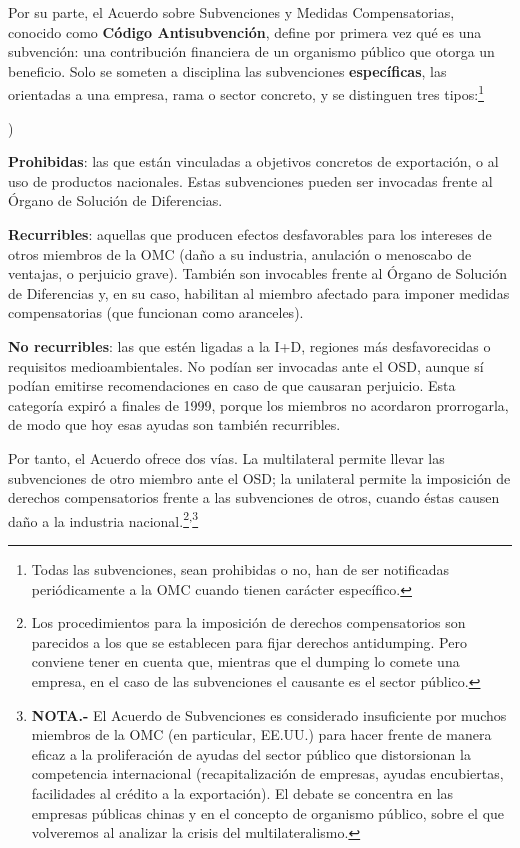 \documentclass[10pt,a4paper]{article}
\newcounter{alphaitem}
\newenvironment{la}
      {\begin{list}{\alph{alphaitem})}{%
          \usecounter{alphaitem}%
          \setlength{\leftmargin}{1cm}%
          \setlength{\parskip}{3pt}%
          \setlength{\itemsep}{0pt}%
          \setlength{\parsep}{0pt}%
      }}
      {\end{list}}
\begin{document}
Por su parte, el Acuerdo sobre Subvenciones y Medidas Compensatorias, conocido como \textbf{Código Antisubvención}, define por primera vez qué es una subvención: una contribución financiera de un organismo público que otorga un beneficio. Solo se someten a disciplina las subvenciones \textbf{específicas}, las orientadas a una empresa, rama o sector concreto, y se distinguen tres tipos:\footnote{%
  Todas las subvenciones, sean prohibidas o no, han de ser notificadas periódicamente a la OMC cuando tienen carácter específico. 
}
\begin{la}
    \item \textbf{Prohibidas}: las que están vinculadas a objetivos concretos de exportación, o al uso de productos nacionales. Estas subvenciones pueden ser invocadas frente al Órgano de Solución de Diferencias.
    \item \textbf{Recurribles}: aquellas que producen efectos desfavorables para los intereses de otros miembros de la OMC (daño a su industria, anulación o menoscabo de ventajas, o perjuicio grave). También son invocables frente al Órgano de Solución de Diferencias y, en su caso, habilitan al miembro afectado para imponer medidas compensatorias (que funcionan como aranceles).
    \item \textbf{No recurribles}: las que estén ligadas a la I+D, regiones más desfavorecidas o requisitos medioambientales. No podían ser invocadas ante el OSD, aunque sí podían emitirse recomendaciones en caso de que causaran perjuicio. Esta categoría expiró a finales de 1999, porque los miembros no acordaron prorrogarla, de modo que hoy esas ayudas son también recurribles.
\end{la}

Por tanto, el Acuerdo ofrece dos vías. La multilateral permite llevar las subvenciones de otro miembro ante el OSD; la unilateral permite la imposición de derechos compensatorios frente a las subvenciones de otros, cuando éstas causen daño a la industria nacional.\footnote{%
  Los procedimientos para la imposición de derechos compensatorios son parecidos a los que se establecen para fijar derechos antidumping. Pero conviene tener en cuenta que, mientras que el dumping lo comete una empresa, en el caso de las subvenciones el causante es el sector público.
}\textsuperscript{,}\footnote{%
  \textbf{NOTA.-} El Acuerdo de Subvenciones es considerado insuficiente por muchos miembros de la OMC (en particular, EE.UU.) para hacer frente de manera eficaz a la proliferación de ayudas del sector público que distorsionan la competencia internacional (recapitalización de empresas, ayudas encubiertas, facilidades al crédito a la exportación). El debate se concentra en las empresas públicas chinas y en el concepto de organismo público, sobre el que volveremos al analizar la crisis del multilateralismo.
}
\end{document}

